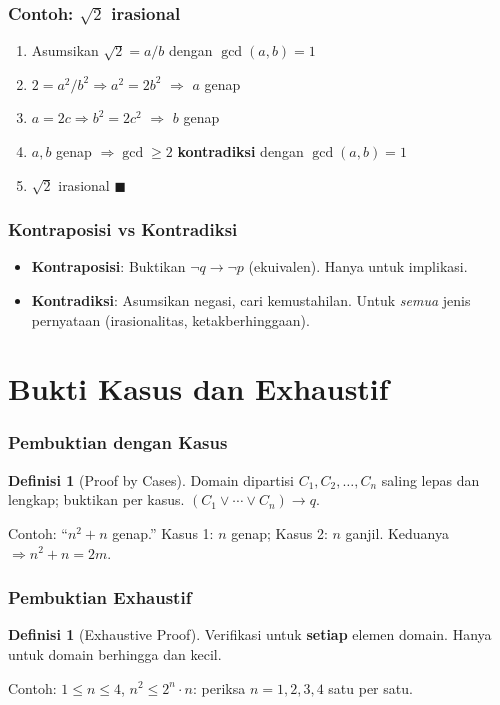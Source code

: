 \documentclass[handout]{beamer}
\theoremstyle{definition}
\newtheorem{definisi}[theorem]{Definisi}
\theoremstyle{example}
\begin{document}
\begin{frame}
\frametitle{Contoh: $\sqrt{2}$ irasional}
\begin{enumerate}
  \item Asumsikan $\sqrt{2} = a/b$ dengan $\gcd(a,b)=1$
  \item $2 = a^2/b^2 \Rightarrow a^2 = 2b^2$ $\Rightarrow$ $a$ genap
  \item $a = 2c \Rightarrow b^2 = 2c^2$ $\Rightarrow$ $b$ genap
  \item $a,b$ genap $\Rightarrow \gcd \geq 2$ \textbf{kontradiksi} dengan $\gcd(a,b)=1$
  \item $\sqrt{2}$ irasional $\blacksquare$
\end{enumerate}
\end{frame}

\begin{frame}
\frametitle{Kontraposisi vs Kontradiksi}
\begin{itemize}
  \item \textbf{Kontraposisi}: Buktikan $\neg q \to \neg p$ (ekuivalen). Hanya untuk implikasi.
  \item \textbf{Kontradiksi}: Asumsikan negasi, cari kemustahilan. Untuk \emph{semua} jenis pernyataan (irasionalitas, ketakberhinggaan).
\end{itemize}
\end{frame}

\section{Bukti Kasus dan Exhaustif}

\begin{frame}
\frametitle{Pembuktian dengan Kasus}
\begin{definisi}[Proof by Cases]
Domain dipartisi $C_1, C_2, \ldots, C_n$ saling lepas dan lengkap; buktikan per kasus. $(C_1 \vee \cdots \vee C_n) \to q$.
\end{definisi}
Contoh: ``$n^2+n$ genap.'' Kasus 1: $n$ genap; Kasus 2: $n$ ganjil. Keduanya $\Rightarrow n^2+n = 2m$.
\end{frame}

\begin{frame}
\frametitle{Pembuktian Exhaustif}
\begin{definisi}[Exhaustive Proof]
Verifikasi untuk \textbf{setiap} elemen domain. Hanya untuk domain berhingga dan kecil.
\end{definisi}
Contoh: $1 \leq n \leq 4$, $n^2 \leq 2^n \cdot n$: periksa $n=1,2,3,4$ satu per satu.
\end{frame}
\end{document}
